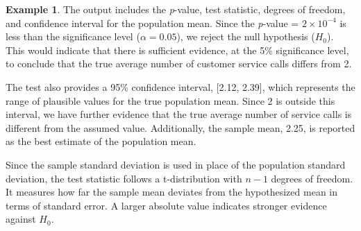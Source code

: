 \documentclass[
  11pt,
]{book}
\makeatletter
\newenvironment{Shaded}{}{}
\newcommand{\AttributeTok}[1]{#1}
\newcommand{\DecValTok}[1]{#1}
\newcommand{\FloatTok}[1]{#1}
\newcommand{\FunctionTok}[1]{#1}
\newcommand{\NormalTok}[1]{#1}
\newcommand{\OtherTok}[1]{\textcolor[rgb]{0.39,0.39,0.39}{#1}}
\newcommand{\SpecialCharTok}[1]{\textcolor[rgb]{0.39,0.39,0.39}{#1}}
\newenvironment{kframe}{%
\medskip{}
\setlength{\fboxsep}{.8em}
 \def\at@end@of@kframe{}%
 \ifinner\ifhmode%
  \def\at@end@of@kframe{\end{minipage}}%
  \begin{minipage}{\columnwidth}%
 \fi\fi%
 \def\FrameCommand##1{\hskip\@totalleftmargin \hskip-\fboxsep
 \colorbox{shadecolor}{##1}\hskip-\fboxsep
     \hskip-\linewidth \hskip-\@totalleftmargin \hskip\columnwidth}%
 \MakeFramed {\advance\hsize-\width
   \@totalleftmargin\z@ \linewidth\hsize
   \@setminipage}}%
 {\par\unskip\endMakeFramed%
 \at@end@of@kframe}
\renewenvironment{Shaded}{\begin{kframe}}{\end{kframe}}
\theoremstyle{definition}
\theoremstyle{definition}
\newtheorem{example}{Example}[chapter]
\theoremstyle{definition}
\theoremstyle{definition}
\theoremstyle{remark}
\makeatother
\begin{document}
\begin{example}
\begin{Shaded}
\end{Shaded}

The output includes the \emph{p}-value, test statistic, degrees of freedom, and confidence interval for the population mean. Since the \emph{p}-value = \ensuremath{2\times 10^{-4}} is less than the significance level (\(\alpha = 0.05\)), we reject the null hypothesis (\(H_0\)). This would indicate that there is sufficient evidence, at the 5\% significance level, to conclude that the true average number of customer service calls differs from 2.

The test also provides a 95\% confidence interval, {[}2.12, 2.39{]}, which represents the range of plausible values for the true population mean. Since 2 is outside this interval, we have further evidence that the true average number of service calls is different from the assumed value. Additionally, the sample mean, 2.25, is reported as the best estimate of the population mean.

Since the sample standard deviation is used in place of the population standard deviation, the test statistic follows a t-distribution with \(n - 1\) degrees of freedom. It measures how far the sample mean deviates from the hypothesized mean in terms of standard error. A larger absolute value indicates stronger evidence against \(H_0\).
\end{example}
\end{document}
